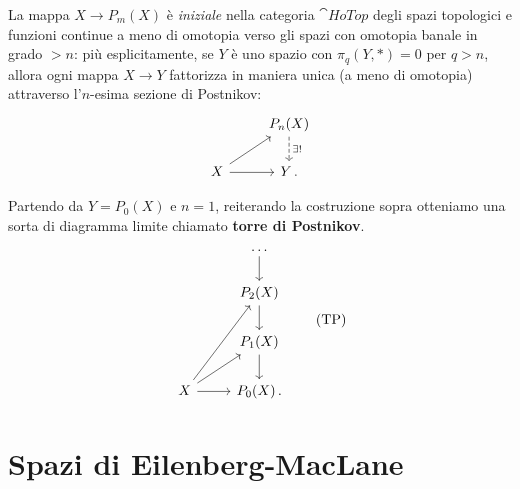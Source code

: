 \begin{oss}
	La mappa $X \to P_{m}(X)$ è \emph{iniziale} nella
	categoria $\cat{HoTop}$ degli spazi topologici e 
	funzioni continue a meno di omotopia
	verso gli spazi con omotopia banale in grado $> n$:
	più esplicitamente, se $Y$ è uno spazio con $\pi_{q}(Y,\ast)=0$
	per $q > n$, allora ogni mappa $X \to Y$ fattorizza in maniera
	unica (a meno di omotopia) attraverso l'$n$-esima sezione di Postnikov:
	\begin{equation*}
	\begin{tikzcd}
		& P_{n}(X) \ar[d, "\exists !", dashed] \\
		X  \ar[r] \ar[ur] & Y \,.
	\end{tikzcd}
\end{equation*}
\end{oss}

Partendo da $Y=P_{0}(X)$ e $n=1$, reiterando la costruzione sopra
otteniamo una sorta di diagramma limite chiamato
\textbf{torre di Postnikov}.
\begin{equation}\label{TP}
	\begin{tikzcd}
		& \dots \ar[d] \\
		& P_{2}(X) \ar[d] \\
		& P_{1} (X) \ar[d] \\
		X \ar[uur] \ar[ur] \ar[r] & P_{0}(X) \,.
	\end{tikzcd} \tag{TP}
\end{equation}

\section{Spazi di Eilenberg-MacLane}

